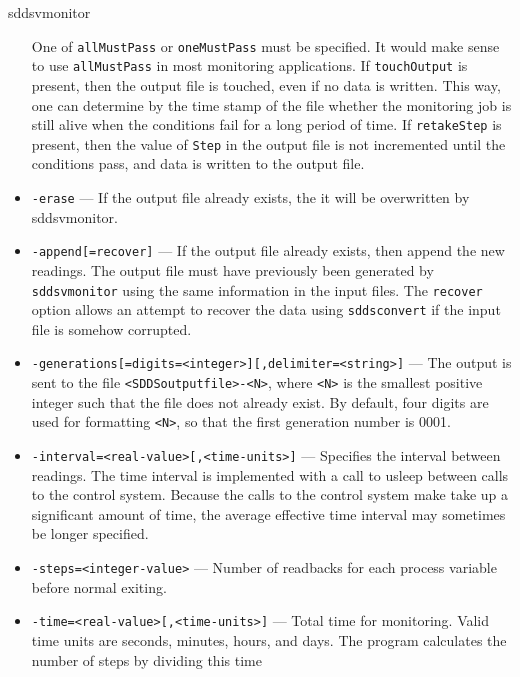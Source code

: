 \begin{sddsprog}{sddsvmonitor}
\begin{itemize}
                One of \verb+allMustPass+ or \verb+oneMustPass+ must be specified. It would make sense
                to use \verb+allMustPass+ in most monitoring applications.
                If \verb+touchOutput+ is present, then the output file is touched, even if no data
                is written. This way, one can determine by the time stamp of the file
                whether the monitoring job is still alive
                when the conditions fail for a long period of time. If \verb+retakeStep+ is
                present, then the value of \verb+Step+ in the output file is not
                incremented until the conditions pass, and data is written to the output file.

        \item {\tt -erase} --- If the output file already exists, the it will be overwritten
                by sddsvmonitor.
        \item {\tt -append[=recover]} --- If the output file already exists, then append the new readings.
                The output file must have previously been generated by \verb+sddsvmonitor+ using the same
                information in the input files.
                The {\verb+recover+} option allows an attempt
                to recover the data using \verb+sddsconvert+ if the input file is somehow corrupted.
        \item {\verb+-generations[=digits=<integer>][,delimiter=<string>]+} ---
                The output is sent to the file \verb+<SDDSoutputfile>-<N>+, where \verb+<N>+ is
                   the smallest positive integer such that the file does not already
                   exist.   By default, four digits are used for formatting \verb+<N>+, so that
                   the first generation number is 0001.
        \item {\tt -interval=<real-value>[,<time-units>]} --- Specifies the interval between readings. The time
                interval is implemented with a call to usleep between calls to the control system.
                Because the calls to the control system make take up a significant amount of time, the average
                effective time interval may sometimes be longer specified. 
        \item {\tt -steps=<integer-value>} --- Number of readbacks for each process variable before normal exiting.
        \item {\tt -time=<real-value>[,<time-units>]} --- Total time for monitoring. Valid time units are
                seconds, minutes, hours, and days. The program calculates the number of steps by dividing this time

\end{itemize}
\end{sddsprog}
